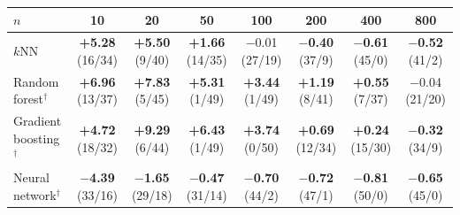 \begin{tabular}{lccccccc}
\toprule
$n$ & 10 & 20 & 50 & 100 & 200 & 400 & 800 \\
\midrule
$k$NN & \textbf{+5.28} (16/34) & \textbf{+5.50} (9/40) & \textbf{+1.66} (14/35) & $-$0.01 (27/19) & \textbf{$-$0.40} (37/9) & \textbf{$-$0.61} (45/0) & \textbf{$-$0.52} (41/2) \\
Random forest$^\dagger$ & \textbf{+6.96} (13/37) & \textbf{+7.83} (5/45) & \textbf{+5.31} (1/49) & \textbf{+3.44} (1/49) & \textbf{+1.19} (8/41) & \textbf{+0.55} (7/37) & $-$0.04 (21/20) \\
Gradient boosting$^\dagger$ & \textbf{+4.72} (18/32) & \textbf{+9.29} (6/44) & \textbf{+6.43} (1/49) & \textbf{+3.74} (0/50) & \textbf{+0.69} (12/34) & \textbf{+0.24} (15/30) & \textbf{$-$0.32} (34/9) \\
Neural network$^\dagger$ & \textbf{$-$4.39} (33/16) & \textbf{$-$1.65} (29/18) & \textbf{$-$0.47} (31/14) & \textbf{$-$0.70} (44/2) & \textbf{$-$0.72} (47/1) & \textbf{$-$0.81} (50/0) & \textbf{$-$0.65} (45/0) \\
\bottomrule
\end{tabular}
